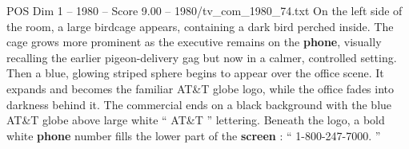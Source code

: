 \begin{textsample}{POS Dim 1 – 1980 – Score 9.00 – 1980/tv\_com\_1980\_74.txt}
On the left side of the room, a large birdcage appears, containing a dark bird perched inside.
The cage grows more prominent as the executive remains on the \textbf{phone}, visually recalling the earlier pigeon-delivery gag but now in a calmer, controlled setting.
Then a blue, glowing striped sphere begins to appear over the office scene.
It expands and becomes the familiar AT\&T globe logo, while the office fades into darkness behind it.
The commercial ends on a black background with the blue AT\&T globe above large white “ AT\&T ” lettering.
Beneath the logo, a bold white \textbf{phone} number fills the lower part of the \textbf{screen} : “ 1-800-247-7000. ”

\end{textsample}
